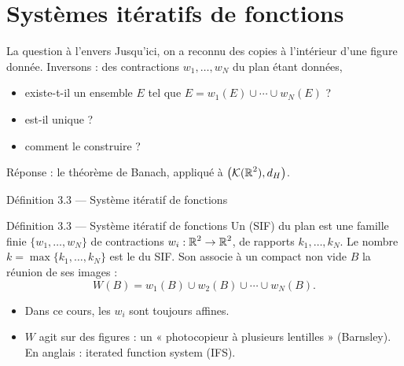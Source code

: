 \section{Systèmes itératifs de fonctions}

\begin{frame}{La question à l'envers}
  \small Jusqu'ici, on a reconnu des copies à l'intérieur d'une figure
  donnée. Inversons : des contractions $w_1,\dots,w_N$ du plan étant
  données,
  \begin{itemize}
    \item existe-t-il un ensemble $E$ tel que $E = w_1(E)\cup\cdots\cup w_N(E)$ ?
    \item est-il unique ?
    \item comment le construire ?
  \end{itemize}
  \vspace{4pt}
  Réponse : le théorème de Banach, appliqué à $\big(\mathcal{K}(\operatorname{\mathbb{R}}^2),d_H\big)$.
\end{frame}

\begin{frame}{Définition 3.3 --- Système itératif de fonctions}
  \begin{Enonce}{Définition 3.3 --- Système itératif de fonctions}
    Un  (SIF) du plan est une famille
    finie $\{w_1,\dots,w_N\}$ de contractions $w_i:\operatorname{\mathbb{R}}^2\to\operatorname{\mathbb{R}}^2$, de
    rapports $k_1,\dots,k_N$. Le nombre $k=\max\{k_1,\dots,k_N\}$ est le
     du SIF. Son  associe à un compact non vide $B$ la réunion de ses
    images :
    \[
      W(B) = w_1(B)\cup w_2(B)\cup\cdots\cup w_N(B).
    \]
  \end{Enonce}
  \small
  \begin{itemize}
    \item Dans ce cours, les $w_i$ sont toujours affines.
    \item $W$ agit sur des figures : un « photocopieur à plusieurs
      lentilles » (Barnsley). En anglais : iterated function system (IFS).
  \end{itemize}
\end{frame}

